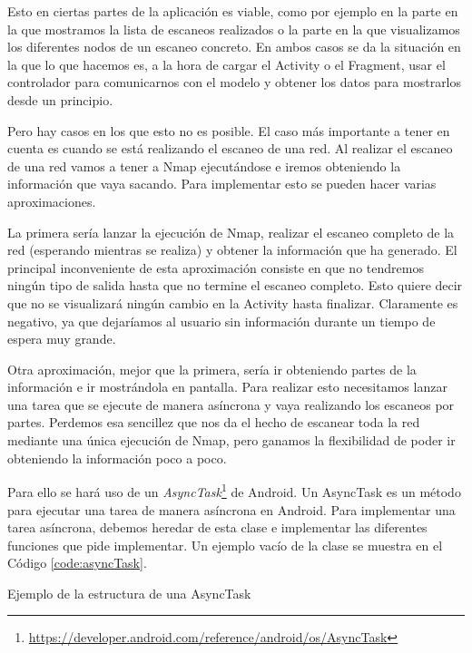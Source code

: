 Esto en ciertas partes de la aplicación es viable, como por ejemplo en la parte en la que mostramos la lista de escaneos realizados o la parte en la que visualizamos los diferentes nodos de un escaneo concreto. En ambos casos se da la situación en la que lo que hacemos es, a la hora de cargar el Activity o el Fragment, usar el controlador para comunicarnos con el modelo y obtener los datos para mostrarlos desde un principio.

Pero hay casos en los que esto no es posible. El caso más importante a tener en cuenta es  cuando se está realizando el escaneo de una red. Al realizar el escaneo de una red vamos a tener a Nmap ejecutándose e iremos obteniendo la información que vaya sacando. Para implementar esto se pueden hacer varias aproximaciones.

La primera sería lanzar la ejecución de Nmap, realizar el escaneo completo de la red (esperando mientras se realiza) y obtener la información que ha generado. El principal inconveniente de esta aproximación consiste en que no tendremos ningún tipo de salida hasta que no termine el escaneo completo. Esto quiere decir que no se visualizará ningún cambio en la Activity hasta finalizar. Claramente es negativo, ya que dejaríamos al usuario sin información durante un tiempo de espera muy grande. 

Otra aproximación, mejor que la primera, sería ir obteniendo partes de la información e ir mostrándola en pantalla. Para realizar esto necesitamos lanzar una tarea que se ejecute de manera asíncrona y vaya realizando los escaneos por partes. Perdemos esa sencillez que nos da el hecho de escanear toda la red mediante una única ejecución de Nmap, pero ganamos la flexibilidad de poder ir obteniendo la información poco a poco.

Para ello se hará uso de un \textit{AsyncTask}\footnote{\url{https://developer.android.com/reference/android/os/AsyncTask}} de Android. Un AsyncTask es un método para ejecutar una tarea de manera asíncrona en Android. Para implementar una tarea asíncrona, debemos heredar de esta clase e implementar las diferentes funciones que pide implementar. Un ejemplo vacío de la clase se muestra en el Código \ref{code:asyncTask}.

\begin{code}
	\caption{Ejemplo de la estructura de una AsyncTask}
	\label{code:asyncTask}
	
\end{code}

